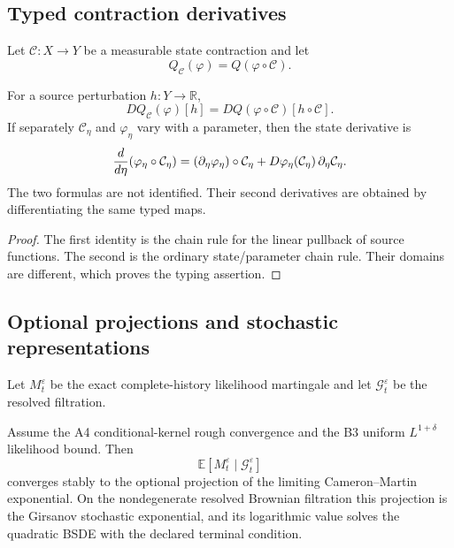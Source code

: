 \subsection{Typed contraction derivatives}

Let \(\mathcal C:X\to Y\) be a measurable state contraction and let
\[
 Q_{\mathcal C}(\varphi)=Q(\varphi\circ\mathcal C).
\]

\begin{theorem}
\label{thm:r14-c2-chain}
For a source perturbation \(h:Y\to\mathbb R\),
\[
 DQ_{\mathcal C}(\varphi)[h]
 =
 DQ(\varphi\circ\mathcal C)[h\circ\mathcal C].
\]
If separately \(\mathcal C_\eta\) and \(\varphi_\eta\) vary with a parameter,
then the state derivative is
\[
 {d\over d\eta}
 (\varphi_\eta\circ\mathcal C_\eta)
 =
 (\partial_\eta\varphi_\eta)\circ\mathcal C_\eta
 +D\varphi_\eta(\mathcal C_\eta)
  \,\partial_\eta\mathcal C_\eta .
\]
The two formulas are not identified.  Their second derivatives are obtained
by differentiating the same typed maps.
\end{theorem}

\begin{proof}
The first identity is the chain rule for the linear pullback of source
functions.  The second is the ordinary state/parameter chain rule.  Their
domains are different, which proves the typing assertion.
\end{proof}

\subsection{Optional projections and stochastic representations}

Let \(M_t^\varepsilon\) be the exact complete-history likelihood martingale
and let \(\mathcal G_t^\varepsilon\) be the resolved filtration.

\begin{theorem}
\label{thm:r14-c2-likelihood}
Assume the A4 conditional-kernel rough convergence and the B3 uniform
\(L^{1+\delta}\) likelihood bound.  Then
\[
 \mathbb E[M_t^\varepsilon\mid\mathcal G_t^\varepsilon]
\]
converges stably to the optional projection of the limiting
Cameron--Martin exponential.  On the nondegenerate resolved Brownian
filtration this projection is the Girsanov stochastic exponential, and its
logarithmic value solves the quadratic BSDE with the declared terminal
condition.
\end{theorem}

